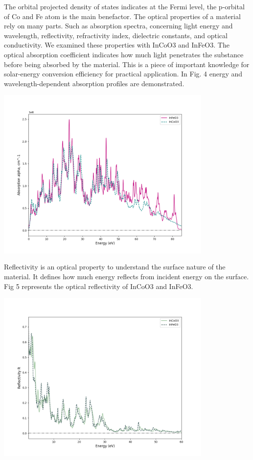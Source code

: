 \documentclass[12pt, letterpaper]{article}
\newcommand*{\1}{\hspace{1pt}}
\begin{document}
    The orbital projected density of states indicates at the Fermi level, the p-orbital of Co and Fe atom is the main benefactor. The optical properties of a 
    material rely on many parts. Such as absorption spectra, concerning light energy and wavelength, reflectivity, refractivity index, dielectric constants, and 
    optical conductivity. We examined these properties with InCoO3 and InFeO3.  The optical absorption coefficient indicates how much light penetrates the substance 
    before being absorbed by the material. This is a piece of important knowledge for solar-energy conversion efficiency for practical application. In Fig. 4 energy 
    and wavelength-dependent absorption profiles are demonstrated.
    
    \begin{adjustbox}{center,caption={Absorption Of InCoO3 and InFeO3},label={somelabel},nofloat=figure,vspace=\bigskipamount,}
        \includegraphics[width=0.8\textwidth]{Absorptioneng}
    \end{adjustbox}
    
    Reflectivity is an optical property to understand the surface nature of the material. It defines 
    how much energy reflects from incident energy on the surface. Fig 5 represents the optical reflectivity of InCoO3 and InFeO3. 
    
    \begin{adjustbox}{center,caption={Reflectivity Of InCoO3 and InFeO3},label={somelabel},nofloat=figure,vspace=\bigskipamount,}
        \includegraphics[width=0.8\textwidth]{refleceng}
    \end{adjustbox}
    
\end{document}
